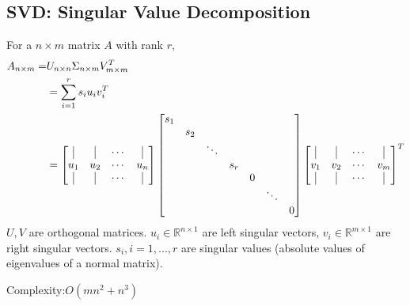 \documentclass[11pt,a4paper]{article}
\begin{document}
\subsection{SVD: Singular Value Decomposition}
For a $n\times m$ matrix $A$ with rank $r$,
\begin{equation}
    \begin{aligned}
        A_{n\times m}=&U_{n\times n}\Sigma_{n\times m}V^T_{m\times m}\\
        &=\sum_{i=1}^rs_iu_iv_i^T\\
        &=\begin{bmatrix}
            \vline&\vline&\cdots&\vline\\
            u_1&u_2&\cdots&u_n\\
            \vline&\vline&\cdots&\vline
        \end{bmatrix}\begin{bmatrix}
            s_1&&&&&&\\
            &s_2&&&&&\\
            &&\ddots&&&&\\
            &&&s_r&&&\\
            &&&&0&&\\
            &&&&&\ddots&\\
            &&&&&&0
        \end{bmatrix}\begin{bmatrix}
            \vline&\vline&\cdots&\vline\\
            v_1&v_2&\cdots&v_m\\
            \vline&\vline&\cdots&\vline
        \end{bmatrix}^T
    \end{aligned}
    \nonumber
\end{equation}
$U,V$ are orthogonal matrices. $u_i\in \mathbb{R}^{n\times 1}$ are left singular vectors, $v_i\in \mathbb{R}^{m\times 1}$ are right singular vectors. $s_i,i=1,...,r$ are singular values (absolute values of eigenvalues of a normal matrix).

Complexity:$O(mn^2+n^3)$
\end{document}
